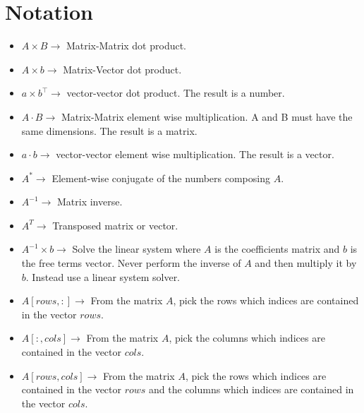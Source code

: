 \documentclass[a4paper,twoside,fleqn]{tufte-book}
\begin{document}
\chapter{Notation}
\begin{fullwidth}

\begin{multicols}{2}

\begin{itemize}
	
	\item $A \times B \rightarrow$ Matrix-Matrix dot product.
	
	\item $A \times b \rightarrow$ Matrix-Vector dot product.
	
	\item $a \times b^\top \rightarrow$ vector-vector dot product. The result is a number.
	
	\item $A \cdot B \rightarrow$ Matrix-Matrix element wise multiplication. A and B must have the same dimensions. The result is a matrix.
	
	\item $a \cdot b \rightarrow$ vector-vector element wise multiplication. The result is a vector.
	
	\item $A^{*}\rightarrow$ Element-wise conjugate of the numbers composing $A$.
	
	\item $A^{-1}\rightarrow$ Matrix inverse.
	
	\item $A^{T}\rightarrow$ Transposed matrix or vector.
	
	\item $A^{-1} \times b \rightarrow$ Solve the linear system where $A$ is the coefficients matrix and $b$ is the free terms vector. Never perform the inverse of $A$ and then multiply it by $b$. Instead use a linear system solver.
	
	\item $A[rows, :] \rightarrow$ From the matrix $A$, pick the rows which indices are contained in the vector $rows$.
	
	
	\item $A[:, cols] \rightarrow$ From the matrix $A$, pick the columns which indices are contained in the vector  $cols$.
	
	
	\item $A[rows, cols] \rightarrow$ From the matrix $A$, pick the rows which indices are contained in the vector  $rows$ and the columns which indices are contained in the vector  $cols$.
	

\end{itemize}
\end{multicols}
\end{fullwidth}
\end{document}
